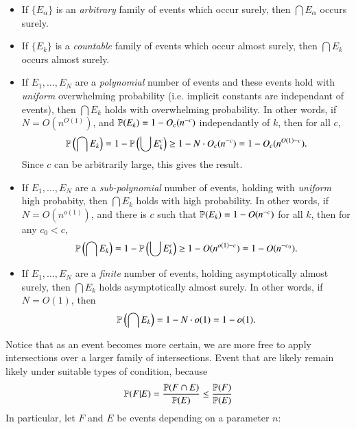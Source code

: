 \begin{itemize}
    \item If $\{ E_\alpha \}$ is an \emph{arbitrary} family of events which occur surely, then $\bigcap E_\alpha$ occurs surely.
    \item If $\{ E_k \}$ is a \emph{countable} family of events which occur almost surely, then $\bigcap E_k$ occurs almost surely.
    \item If $E_1, \dots, E_N$ are a \emph{polynomial} number of events and these events hold with \emph{uniform} overwhelming probability (i.e. implicit constants are independant of events), then $\bigcap E_k$ holds with overwhelming probability. In other words, if $N = O(n^{O(1)})$, and $\mathbb{P}(E_k) = 1 - O_c(n^{-c})$ independantly of $k$, then for all $c$,
    \[ \mathbb{P} \left( \bigcap E_k \right) = 1 - \mathbb{P} \left( \bigcup E_k^c \right) \geq 1 - N \cdot O_c(n^{-c}) = 1 - O_c(n^{O(1) - c}). \]
    Since $c$ can be arbitrarily large, this gives the result.

    \item If $E_1, \dots, E_N$ are a \emph{sub-polynomial} number of events, holding with \emph{uniform} high probabity, then $\bigcap E_k$ holds with high probability. In other words, if $N = O(n^{o(1)})$, and there is $c$ such that $\mathbb{P}(E_k) = 1 - O(n^{-c})$ for all $k$, then for any $c_0 < c$,
    \[ \mathbb{P} \left( \bigcap E_k \right) = 1 - \mathbb{P} \left( \bigcup E_k^c \right) \geq 1 - O(n^{o(1) - c}) = 1 - O(n^{-c_0}). \]

    \item If $E_1, \dots, E_N$ are a \emph{finite} number of events, holding asymptotically almost surely, then $\bigcap E_k$ holds asymptotically almost surely. In other words, if $N = O(1)$, then
    \[ \mathbb{P} \left( \bigcap E_k \right) = 1 - N \cdot o(1) = 1 - o(1). \]
\end{itemize}
%
Notice that as an event becomes more certain, we are more free to apply intersections over a larger family of intersections. Event that are likely remain likely under suitable types of condition, because
%
\[ \mathbb{P}(F|E) = \frac{\mathbb{P}(F \cap E)}{\mathbb{P}(E)} \leq \frac{\mathbb{P}(F)}{\mathbb{P}(E)} \]
%
In particular, let $F$ and $E$ be events depending on a parameter $n$:
%
